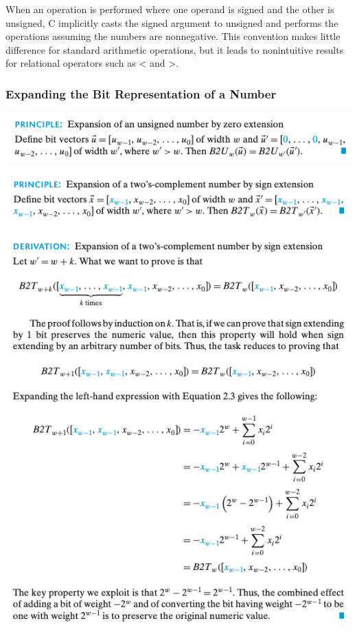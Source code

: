 \documentclass[11pt]{article}
\begin{document}
When an operation is performed where one operand is signed and the other is unsigned, C implicitly casts the signed argument to unsigned and performs the operations assuming the numbers are nonnegative. This convention makes little difference for standard arithmetic operations, but it leads to nonintuitive results for relational operators such as < and >.\\



\subsubsection{Expanding the Bit Representation of a Number}
\label{sec:orgdfa3c18}

\begin{center}
\includegraphics[width=.9\linewidth]{pics/zero-extension.png}
\end{center}

\begin{center}
\includegraphics[width=.9\linewidth]{pics/sign-extension.png}
\end{center}



\begin{center}
\includegraphics[width=.9\linewidth]{pics/derivation-sign-extension.png}
\end{center}
\end{document}
